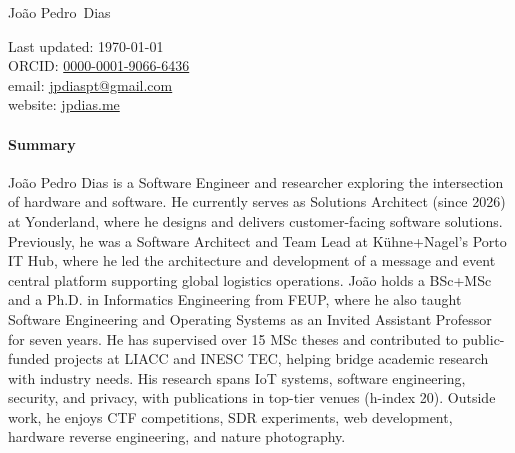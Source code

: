 \documentclass[10pt, a4paper]{article}
\makeatletter
\newcommand{\FirstName}{João Pedro}
\newcommand{\LastName}{Dias}
\newcommand{\MyName}{\FirstName\ \LastName}
\newcommand{\Email}{jpdiaspt@gmail.com}
\newcommand{\Website}{jpdias.me}
\newcommand{\ORCID}{0000-0001-9066-6436}
\let\oldhref\href
\renewcommand{\href}[2]{\oldhref{#1}{{\small #2}}}
\makeatother
\begin{document}
\thispagestyle{firststyle}

{\color{awesome}\fontsize{24pt}{0}\selectfont\MyName \hfill {}}\\

\begin{minipage}[!ht]{0.595\textwidth}
\hspace{\fill}
\end{minipage}
\begin{minipage}[t]{0.4\textwidth}
	\begin{flushright}
		Last updated: \monthyear\today
		\\
		ORCID: \href{https://orcid.org/\ORCID}{\ORCID}
		\\
		email: \href{mailto:\Email}{\Email}
		\\
		website: \href{https://\Website}{\Website}
	\end{flushright}
\end{minipage}
\begin{center}
	\color{awesome} 
	\vspace{-0.85cm}
\end{center}

\paragraph{Summary} João Pedro Dias is a Software Engineer and researcher exploring the intersection of hardware and software. He currently serves as Solutions Architect (since 2026) at Yonderland, where he designs and delivers customer-facing software solutions. Previously, he was a Software Architect and Team Lead at Kühne+Nagel's Porto IT Hub, where he led the architecture and development of a message and event central platform supporting global logistics operations. João holds a BSc+MSc and a Ph.D. in Informatics Engineering from FEUP, where he also taught Software Engineering and Operating Systems as an Invited Assistant Professor for seven years. He has supervised over 15 MSc theses and contributed to public-funded projects at LIACC and INESC TEC, helping bridge academic research with industry needs. His research spans IoT systems, software engineering, security, and privacy, with publications in top-tier venues (h-index 20). Outside work, he enjoys CTF competitions, SDR experiments, web development, hardware reverse engineering, and nature photography.
\vspace{-1.1em}
\end{document}
